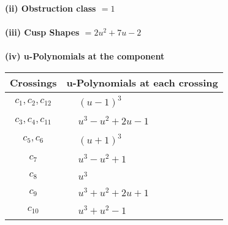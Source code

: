 \documentclass[1p]{elsarticle_modified}
\theoremstyle{definition}
\begin{document}
\flushleft \textbf{(ii) Obstruction class $= 1$}\\~\\
\flushleft \textbf{(iii) Cusp Shapes $= 2 u^2+7 u-2$}\\~\\
\newpage\renewcommand{\arraystretch}{1}
\flushleft \textbf{(iv) u-Polynomials at the component}\newline \\
\begin{tabular}{m{50pt}|m{274pt}}
Crossings & \hspace{64pt}u-Polynomials at each crossing \\
\hline $$\begin{aligned}c_{1},c_{2},c_{12}\end{aligned}$$&$\begin{aligned}
&(u-1)^3
\end{aligned}$\\
\hline $$\begin{aligned}c_{3},c_{4},c_{11}\end{aligned}$$&$\begin{aligned}
&u^3- u^2+2 u-1
\end{aligned}$\\
\hline $$\begin{aligned}c_{5},c_{6}\end{aligned}$$&$\begin{aligned}
&(u+1)^3
\end{aligned}$\\
\hline $$\begin{aligned}c_{7}\end{aligned}$$&$\begin{aligned}
&u^3- u^2+1
\end{aligned}$\\
\hline $$\begin{aligned}c_{8}\end{aligned}$$&$\begin{aligned}
&u^3
\end{aligned}$\\
\hline $$\begin{aligned}c_{9}\end{aligned}$$&$\begin{aligned}
&u^3+u^2+2 u+1
\end{aligned}$\\
\hline $$\begin{aligned}c_{10}\end{aligned}$$&$\begin{aligned}
&u^3+u^2-1
\end{aligned}$\\
\hline
\end{tabular}\\~\\
\end{document}
